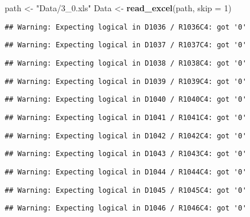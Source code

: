 \documentclass[
]{article}
\newenvironment{Shaded}{\begin{snugshade}}{\end{snugshade}}
\newcommand{\AttributeTok}[1]{\textcolor[rgb]{0.13,0.29,0.53}{#1}}
\newcommand{\DecValTok}[1]{\textcolor[rgb]{0.00,0.00,0.81}{#1}}
\newcommand{\FunctionTok}[1]{\textcolor[rgb]{0.13,0.29,0.53}{\textbf{#1}}}
\newcommand{\NormalTok}[1]{#1}
\newcommand{\OtherTok}[1]{\textcolor[rgb]{0.56,0.35,0.01}{#1}}
\newcommand{\StringTok}[1]{\textcolor[rgb]{0.31,0.60,0.02}{#1}}
\begin{document}
\begin{Shaded}
\begin{Highlighting}[]
\NormalTok{path }\OtherTok{\textless{}{-}} \StringTok{"Data/3\_0.xls"}
\NormalTok{Data }\OtherTok{\textless{}{-}} \FunctionTok{read\_excel}\NormalTok{(path, }\AttributeTok{skip =} \DecValTok{1}\NormalTok{)}
\end{Highlighting}
\end{Shaded}

\begin{verbatim}
## Warning: Expecting logical in D1036 / R1036C4: got '0'
\end{verbatim}

\begin{verbatim}
## Warning: Expecting logical in D1037 / R1037C4: got '0'
\end{verbatim}

\begin{verbatim}
## Warning: Expecting logical in D1038 / R1038C4: got '0'
\end{verbatim}

\begin{verbatim}
## Warning: Expecting logical in D1039 / R1039C4: got '0'
\end{verbatim}

\begin{verbatim}
## Warning: Expecting logical in D1040 / R1040C4: got '0'
\end{verbatim}

\begin{verbatim}
## Warning: Expecting logical in D1041 / R1041C4: got '0'
\end{verbatim}

\begin{verbatim}
## Warning: Expecting logical in D1042 / R1042C4: got '0'
\end{verbatim}

\begin{verbatim}
## Warning: Expecting logical in D1043 / R1043C4: got '0'
\end{verbatim}

\begin{verbatim}
## Warning: Expecting logical in D1044 / R1044C4: got '0'
\end{verbatim}

\begin{verbatim}
## Warning: Expecting logical in D1045 / R1045C4: got '0'
\end{verbatim}

\begin{verbatim}
## Warning: Expecting logical in D1046 / R1046C4: got '0'
\end{verbatim}
\end{document}

